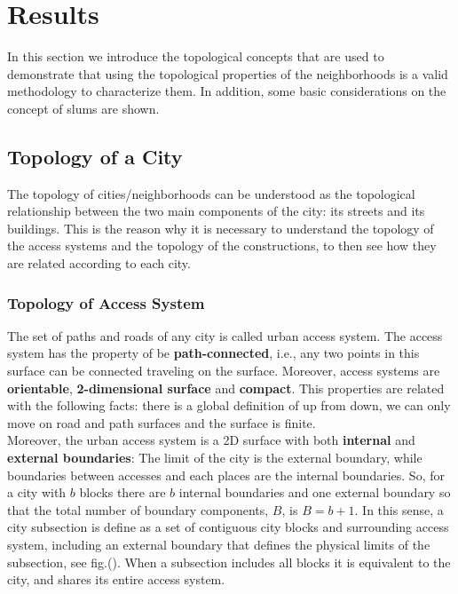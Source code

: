 \documentclass[10pt]{article}
\begin{document}
\section{Results}

In this section we introduce the topological concepts that are used to demonstrate that using the topological properties of the neighborhoods is a valid methodology to characterize them. In addition, some basic considerations on the concept of slums are shown.

\subsection{Topology of a City}
The topology of cities/neighborhoods can be understood as the topological relationship between the two main components of the city: its streets and its buildings. This is the reason why it is necessary to understand the topology of the access systems and the topology of the constructions, to then see how they are related according to each city.

\subsubsection{Topology of Access System}
The set of paths and roads of any city is called urban access system. The access system has the property of be \textbf{path-connected}, i.e., any two points in this surface can be connected traveling on the surface. Moreover, access systems are \textbf{orientable}, \textbf{2-dimensional surface} and \textbf{compact}. This properties are related with the following facts: there is a global definition of up from down, we can only move on road and path surfaces and the surface is finite.\\

Moreover, the urban access system is a 2D surface with both \textbf{internal} and \textbf{external boundaries}: The limit of the city is the external boundary, while boundaries between accesses and each places are the internal boundaries. So, for a city with $b$ blocks there are $b$ internal boundaries and one external boundary so that the total number of boundary components, $B$, is $B = b+1$. In this sense, a city subsection is define as a set of contiguous city blocks and surrounding access system, including an external boundary that defines the physical limits of the subsection, see fig.(). When a subsection includes all blocks it is equivalent to the city, and shares its entire access system.\\
\end{document}
